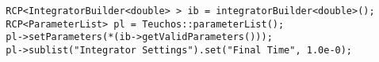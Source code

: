 \begin{verbatim}
  RCP<IntegratorBuilder<double> > ib = integratorBuilder<double>();
  RCP<ParameterList> pl = Teuchos::parameterList();
  pl->setParameters(*(ib->getValidParameters()));
  pl->sublist("Integrator Settings").set("Final Time", 1.0e-0);
\end{verbatim}
